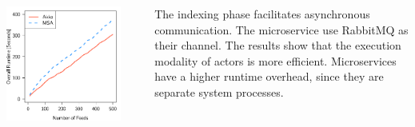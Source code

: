 \documentclass[final,hyperref={pdfpagelabels=true}]{beamer}
\begin{document}
\begin{frame}
\begin{columns}[t]
\begin{column}{.43\textwidth}
      \begin{columns}[t]
        \begin{column}{.46\textwidth}
          \begin{center}
          \includegraphics[width=1\textwidth]{graphics/eval-index-overall.pdf}
          \end{center}
        \end{column}
        \begin{column}{.08\textwidth}
        \end{column}
        \begin{column}{.46\textwidth}
          {\lmodern
            \begin{justify}
            The indexing phase facilitates asynchronous communication. The microservice use RabbitMQ as their channel. The results show that the execution modality of actors is more efficient. Microservices have a higher runtime overhead, since they are separate system processes. 
            \end{justify}
          }
        \end{column}
      \end{columns}

      \vspace*{2\baselineskip}


\end{column}
\end{columns}
\end{frame}
\end{document}
